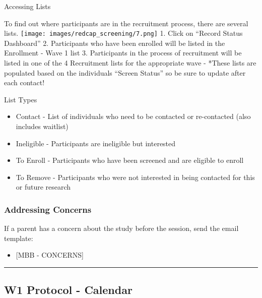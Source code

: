\documentclass[
]{book}
\providecommand{\tightlist}{%
  \setlength{\itemsep}{0pt}\setlength{\parskip}{0pt}}
\begin{document}
Accessing Lists

To find out where participants are in the recruitment process, there are several lists.
\texttt{[image: images/redcap\_screening/7.png]}
1. Click on ``Record Status Dashboard''
2. Participants who have been enrolled will be listed in the Enrollment - Wave 1 list
3. Participants in the process of recruitment will be listed in one of the 4 Recruitment lists for the appropriate wave
- *These lists are populated based on the individuals ``Screen Status'' so be sure to update after each contact!

List Types

\begin{itemize}
\tightlist
\item
  Contact - List of individuals who need to be contacted or re-contacted (also includes waitlist)
\item
  Ineligible - Participants are ineligible but interested
\item
  To Enroll - Participants who have been screened and are eligible to enroll
\item
  To Remove - Participants who were not interested in being contacted for this or future research
\end{itemize}

\hypertarget{addressing-concerns}{%
\subsubsection{Addressing Concerns}\label{addressing-concerns}}

If a parent has a concern about the study before the session, send the email template:

\begin{itemize}
\tightlist
\item
  {[}MBB - CONCERNS{]}
\end{itemize}

\begin{center}\rule{0.5\linewidth}{0.5pt}\end{center}

\hypertarget{w1-protocol---calendar}{%
\subsection{W1 Protocol - Calendar}\label{w1-protocol---calendar}}
\end{document}
